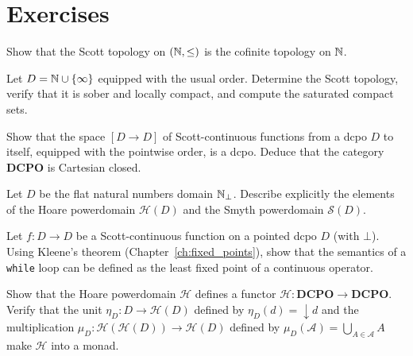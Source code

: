 \section{Exercises}

\begin{exercise}
Show that the Scott topology on $(\mathbb{N}, \leq)$ is the cofinite topology on $\mathbb{N}$.
\end{exercise}

\begin{exercise}
Let $D = \mathbb{N} \cup \{\infty\}$ equipped with the usual order. Determine the Scott topology,
verify that it is sober and locally compact, and compute the saturated compact sets.
\end{exercise}

\begin{exercise}
Show that the space $[D \to D]$ of Scott-continuous functions from a dcpo $D$ to itself,
equipped with the pointwise order, is a dcpo. Deduce that the category $\mathbf{DCPO}$ is
Cartesian closed.
\end{exercise}

\begin{exercise}
Let $D$ be the flat natural numbers domain $\mathbb{N}_\bot$. Describe explicitly the elements of
the Hoare powerdomain $\mathcal{H}(D)$ and the Smyth powerdomain $\mathcal{S}(D)$.
\end{exercise}

\begin{exercise}
Let $f\colon D \to D$ be a Scott-continuous function on a pointed dcpo $D$ (with $\bot$).
Using Kleene's theorem (Chapter~\ref{ch:fixed_points}), show that the semantics of a
\texttt{while} loop can be defined as the least fixed point of a continuous operator.
\end{exercise}

\begin{exercise}
Show that the Hoare powerdomain $\mathcal{H}$ defines a functor
$\mathcal{H}\colon \mathbf{DCPO} \to \mathbf{DCPO}$. Verify that the unit
$\eta_D\colon D \to \mathcal{H}(D)$ defined by $\eta_D(d) = {\downarrow} d$ and the
multiplication $\mu_D\colon \mathcal{H}(\mathcal{H}(D)) \to \mathcal{H}(D)$ defined by
$\mu_D(\mathcal{A}) = \bigcup_{A \in \mathcal{A}} A$ make $\mathcal{H}$ into a monad.
\end{exercise}

